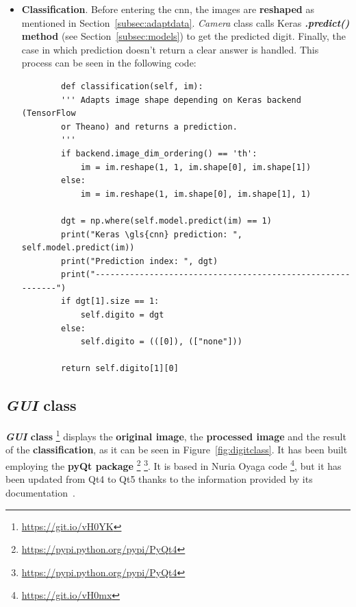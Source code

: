 \begin{itemize}
\begin{lstlisting}[frame=single]
			im_res = cv2.resize(im_blur, (28, 28))
			 
			# Edge extraction.
			im_sobel_x = cv2.Sobel(im_res, cv2.CV_32F, 1, 0, ksize=5)
			im_sobel_y = cv2.Sobel(im_res, cv2.CV_32F, 0, 1, ksize=5)
			im_edges = cv2.add(abs(im_sobel_x), abs(im_sobel_y))
			im_edges = cv2.normalize(im_edges, None, 0, 255, cv2.NORM_MINMAX)
			im_edges = np.uint8(im_edges)
			 
			return im_edges
	\end{lstlisting}
	
	\item \textbf{Classification}. Before entering the \gls{cnn}, the images are \textbf{reshaped} as mentioned in Section~\ref{subsec:adaptdata}. \textit{Camera} class calls Keras \textbf{\textit{.predict()} method} (see Section~\ref{subsec:models}) to get the predicted digit. Finally, the case in which prediction doesn't return a clear answer is handled. This process can be seen in the following code:
	\begin{lstlisting}
	    def classification(self, im):
	    ''' Adapts image shape depending on Keras backend (TensorFlow
	    or Theano) and returns a prediction.
	    '''
	    if backend.image_dim_ordering() == 'th':
		    im = im.reshape(1, 1, im.shape[0], im.shape[1])            
	    else:      
		    im = im.reshape(1, im.shape[0], im.shape[1], 1)            
	    
	    dgt = np.where(self.model.predict(im) == 1)
	    print("Keras \gls{cnn} prediction: ", self.model.predict(im))
	    print("Prediction index: ", dgt)
	    print("-----------------------------------------------------------")
	    if dgt[1].size == 1:
		    self.digito = dgt
	    else:
		    self.digito = (([0]), (["none"]))
	    
	    return self.digito[1][0]
	\end{lstlisting}
\end{itemize}

\subsection{\textit{GUI} class}
\textbf{\textit{GUI} class} \footnote{\url{https://git.io/vH0YK}} displays the \textbf{original image}, the \textbf{processed image} and the result of the \textbf{classification}, as it can be seen in Figure~\ref{fig:digitclass}. It has been built employing the \textbf{pyQt package} \footnote{\url{https://pypi.python.org/pypi/PyQt4}} \footnote{\url{https://pypi.python.org/pypi/PyQt4}}. It is based in Nuria Oyaga code \footnote{\url{https://git.io/vH0mx}}, but it has been updated from Qt4  to Qt5  thanks to the information provided by its documentation~\cite{pyqt5}.

